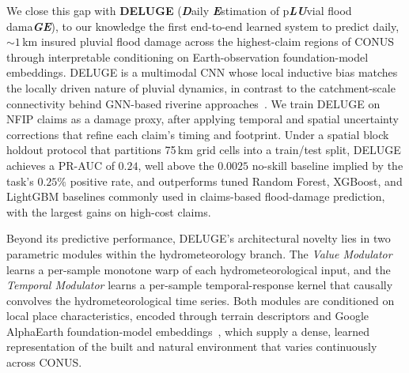 We close this gap with \textbf{DELUGE} (\textit{\textbf{D}}aily \textit{\textbf{E}}stimation of p\textit{\textbf{LU}}vial flood dama\textit{\textbf{GE}}), to our knowledge the first end-to-end learned system to predict daily, ${\sim}1$\,km insured pluvial flood damage across the highest-claim regions of CONUS through interpretable conditioning on Earth-observation foundation-model embeddings.
%
DELUGE is a multimodal CNN whose local inductive bias matches the locally driven nature of pluvial dynamics, in contrast to the catchment-scale connectivity behind GNN-based riverine approaches~\cite{sarkar_hydrogat_2025,kazadi_floodgnn-gru_2024}.
%
We train DELUGE on NFIP claims as a damage proxy, after applying temporal and spatial uncertainty corrections that refine each claim's timing and footprint.
%
Under a spatial block holdout protocol that partitions 75\,km grid cells into a train/test split, DELUGE achieves a PR-AUC of \tsim$0.24$, well above the \tsim$0.0025$ no-skill baseline implied by the task's \tsim$0.25\%$ positive rate, and outperforms tuned Random Forest, XGBoost, and LightGBM baselines commonly used in claims-based flood-damage prediction, with the largest gains on high-cost claims.

Beyond its predictive performance, DELUGE's architectural novelty lies in two parametric modules within the hydrometeorology branch.
%
The \emph{Value Modulator} learns a per-sample monotone warp of each hydrometeorological input, and the \emph{Temporal Modulator} learns a per-sample temporal-response kernel that causally convolves the hydrometeorological time series.
%
Both modules are conditioned on local place characteristics, encoded through terrain descriptors and Google AlphaEarth foundation-model embeddings~\cite{brown_alphaearth_2025}, which supply a dense, learned representation of the built and natural environment that varies continuously across CONUS.

